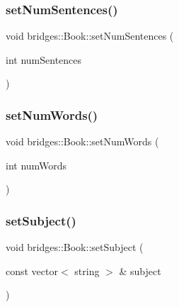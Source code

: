 \mbox{\label{classbridges_1_1_book_af16061c14c40b1672c7801a4c3a2d33b}} 
\subsubsection{\texorpdfstring{setNumSentences()}{setNumSentences()}}
{\footnotesize\ttfamily void bridges\+::\+Book\+::set\+Num\+Sentences (\begin{DoxyParamCaption}\item[{int}]{num\+Sentences }\end{DoxyParamCaption})\hspace{0.3cm}{\ttfamily [inline]}}

\mbox{\label{classbridges_1_1_book_acbed3f0ff253868d8747826a27ef30ac}} 
\subsubsection{\texorpdfstring{setNumWords()}{setNumWords()}}
{\footnotesize\ttfamily void bridges\+::\+Book\+::set\+Num\+Words (\begin{DoxyParamCaption}\item[{int}]{num\+Words }\end{DoxyParamCaption})\hspace{0.3cm}{\ttfamily [inline]}}

\mbox{\label{classbridges_1_1_book_aff19a506929a6df5503e2cd3e293381e}} 
\subsubsection{\texorpdfstring{setSubject()}{setSubject()}}
{\footnotesize\ttfamily void bridges\+::\+Book\+::set\+Subject (\begin{DoxyParamCaption}\item[{const vector$<$ string $>$ \&}]{subject }\end{DoxyParamCaption})\hspace{0.3cm}{\ttfamily [inline]}}


